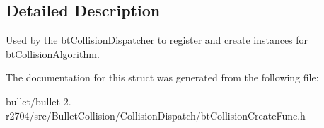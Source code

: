 \subsection{Detailed Description}
Used by the \hyperlink{classbt_collision_dispatcher}{bt\+Collision\+Dispatcher} to register and create instances for \hyperlink{classbt_collision_algorithm}{bt\+Collision\+Algorithm}. 

The documentation for this struct was generated from the following file\+:\begin{DoxyCompactItemize}
\item 
bullet/bullet-\/2.-\/r2704/src/\+Bullet\+Collision/\+Collision\+Dispatch/bt\+Collision\+Create\+Func.\+h\end{DoxyCompactItemize}
